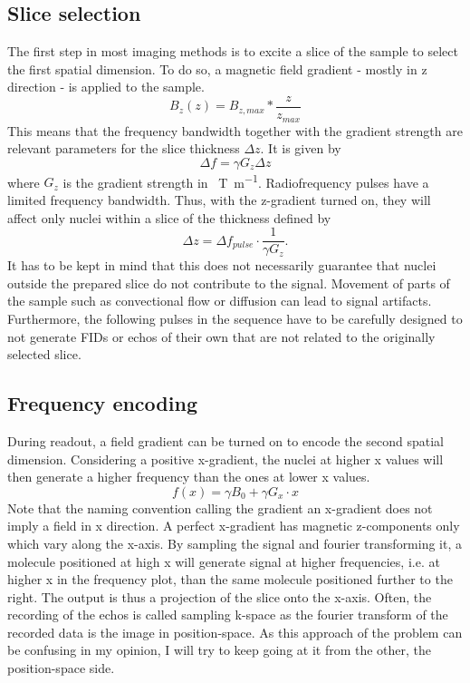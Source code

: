        \subsection{Slice selection}
            The first step in most imaging methods is to excite a slice of the sample to select the first spatial dimension. To do so, a magnetic field gradient - mostly in z direction - is applied to the sample. 
            \begin{equation}
                B_z(z) = B_{z,max} * \frac{z}{z_{max}}
            \end{equation}
            This means that the frequency bandwidth together with the gradient strength are relevant parameters for the slice thickness $\Delta z$. It is given by 
            \begin{equation}
                \Delta f = \gamma G_z \Delta z
            \end{equation}
            where $G_z$ is the gradient strength in \SI{}{\tesla\per\meter}.
            Radiofrequency pulses have a limited frequency bandwidth. Thus, with the z-gradient turned on, they will affect only nuclei within a slice of the thickness defined by
            \begin{equation}
                \Delta z = \Delta f_{pulse} \cdot \frac{1}{\gamma G_z}.
            \end{equation}
             It has to be kept in mind that this does not necessarily guarantee that nuclei outside the prepared slice do not contribute to the signal. Movement of parts of the sample such as convectional flow or diffusion can lead to signal artifacts. Furthermore, the following pulses in the sequence have to be carefully designed to not generate FIDs or echos of their own that are not related to the originally selected slice.
        \subsection{Frequency encoding}
            During readout, a field gradient can be turned on to encode the second spatial dimension. Considering a positive x-gradient, the nuclei at higher x values will then generate a higher frequency than the ones at lower x values.
            \begin{equation}
                f(x) = \gamma B_0 + \gamma G_x \cdot x
            \end{equation}
            Note that the naming convention calling the gradient an x-gradient does not imply a field in x direction. A perfect x-gradient has magnetic z-components only which vary along the x-axis. By sampling the signal and fourier transforming it, a molecule positioned at high x will generate signal at higher frequencies, i.e. at higher x in the frequency plot, than the same molecule positioned further to the right. The output is thus a projection of the slice onto the x-axis.
            Often, the recording of the echos is called sampling k-space as the fourier transform of the recorded data is the image in position-space. As this approach of the problem can be confusing in my opinion, I will try to keep going at it from the other, the position-space side.
